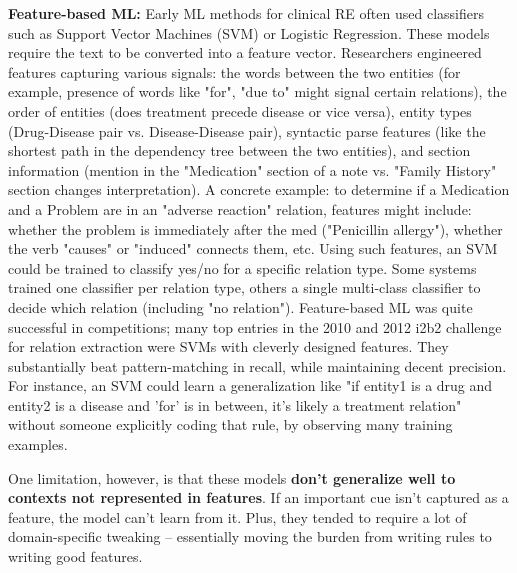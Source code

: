 \textbf{Feature-based ML:} Early ML methods for clinical RE often used classifiers such as Support Vector Machines (SVM) or Logistic Regression. These models require the text to be converted into a feature vector. Researchers engineered features capturing various signals: the words between the two entities (for example, presence of words like "for", "due to" might signal certain relations), the order of entities (does treatment precede disease or vice versa), entity types (Drug-Disease pair vs. Disease-Disease pair), syntactic parse features (like the shortest path in the dependency tree between the two entities), and section information (mention in the "Medication" section of a note vs. "Family History" section changes interpretation). A concrete example: to determine if a Medication and a Problem are in an "adverse reaction" relation, features might include: whether the problem is immediately after the med ("Penicillin allergy"), whether the verb "causes" or "induced" connects them, etc. Using such features, an SVM could be trained to classify yes/no for a specific relation type. Some systems trained one classifier per relation type, others a single multi-class classifier to decide which relation (including "no relation"). Feature-based ML was quite successful in competitions; many top entries in the 2010 and 2012 i2b2 challenge for relation extraction were SVMs with cleverly designed features. They substantially beat pattern-matching in recall, while maintaining decent precision. For instance, an SVM could learn a generalization like "if entity1 is a drug and entity2 is a disease and 'for' is in between, it's likely a treatment relation" without someone explicitly coding that rule, by observing many training examples.

One limitation, however, is that these models \textbf{don't generalize well to contexts not represented in features}. If an important cue isn't captured as a feature, the model can't learn from it. Plus, they tended to require a lot of domain-specific tweaking – essentially moving the burden from writing rules to writing good features.

